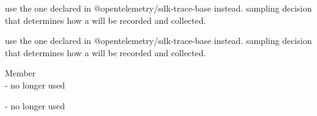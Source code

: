\begin{DoxyRefList}
\label{deprecated__deprecated000033}%
%
use the one declared in @opentelemetry/sdk-\/trace-\/base instead.  sampling decision that determines how a {\ttfamily {}} will be recorded and collected. 

\label{deprecated__deprecated000034}%
%
use the one declared in @opentelemetry/sdk-\/trace-\/base instead.  sampling decision that determines how a {\ttfamily {}} will be recorded and collected.  
\item[Member \doxylink{cjs_2src_2file_8js_aa1d97910d4874d02a4eaab004a125b36}{STORAGE\+\_\+\+POST\+\_\+\+POLICY\+\_\+\+BASE\+\_\+\+URL} ]\hfill \\
\label{deprecated__deprecated000017}%
%
-\/ no longer used 

\label{deprecated__deprecated000030}%
%
-\/ no longer used 
\end{DoxyRefList}